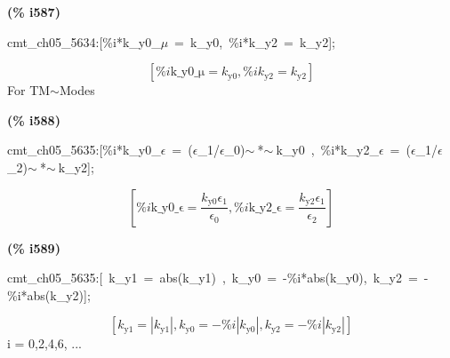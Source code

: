 \documentclass[fleqn]{article}
\begin{document}
\noindent
\begin{minipage}[t]{4.000000em}\color{red}\bfseries
(\% i587)	
\end{minipage}
\begin{minipage}[t]{\textwidth}\color{blue}
cmt\_ch05\_5634:[\%i*k\_y0\_\ensuremath{\mu}\ =\ k\_y0,\ \%i*k\_y2\ =\ k\_y2];
\end{minipage}
\[\displaystyle \tag{\% o587} 
\left[ \% i \ensuremath{\mathrm{k\_ y0\_ \mu }}={k_{\ensuremath{\mathrm{y0}}}}\operatorname{,}\% i {k_{\ensuremath{\mathrm{y2}}}}={k_{\ensuremath{\mathrm{y2}}}}\right] \mbox{}
\]
For TM\ensuremath{\sim }Modes


\noindent
\begin{minipage}[t]{4.000000em}\color{red}\bfseries
(\% i588)	
\end{minipage}
\begin{minipage}[t]{\textwidth}\color{blue}
cmt\_ch05\_5635:[\%i*k\_y0\_\ensuremath{\epsilon}\ =\ (\ensuremath{\epsilon}\_1/\ensuremath{\epsilon}\_0)\ensuremath{\sim\ }*\ensuremath{\sim\ }k\_y0\ ,\ \%i*k\_y2\_\ensuremath{\epsilon}\ =\ (\ensuremath{\epsilon}\_1/\ensuremath{\epsilon}\_2)\ensuremath{\sim\ }*\ensuremath{\sim\ }k\_y2];
\end{minipage}
\[\displaystyle \tag{\% o588} 
\left[ \% i \ensuremath{\mathrm{k\_ y0\_ \epsilon }}=\frac{{k_{\ensuremath{\mathrm{y0}}}} {{\epsilon }_1}}{{{\epsilon }_0}}\operatorname{,}\% i \ensuremath{\mathrm{k\_ y2\_ \epsilon }}=\frac{{k_{\ensuremath{\mathrm{y2}}}} {{\epsilon }_1}}{{{\epsilon }_2}}\right] \mbox{}
\]


\noindent
\begin{minipage}[t]{4.000000em}\color{red}\bfseries
(\% i589)	
\end{minipage}
\begin{minipage}[t]{\textwidth}\color{blue}
cmt\_ch05\_5635:[\ k\_y1\ =\ abs(k\_y1)\ ,\ k\_y0\ =\ -\%i*abs(k\_y0),\ k\_y2\ =\ -\%i*abs(k\_y2)];
\end{minipage}
\[\displaystyle \tag{\% o589} 
\left[ {k_{\ensuremath{\mathrm{y1}}}}=\left| {k_{\ensuremath{\mathrm{y1}}}}\right| \operatorname{,}{k_{\ensuremath{\mathrm{y0}}}}=-\% i \left| {k_{\ensuremath{\mathrm{y0}}}}\right| \operatorname{,}{k_{\ensuremath{\mathrm{y2}}}}=-\% i \left| {k_{\ensuremath{\mathrm{y2}}}}\right| \right] \mbox{}
\]
i = 0,2,4,6, ...
\end{document}
